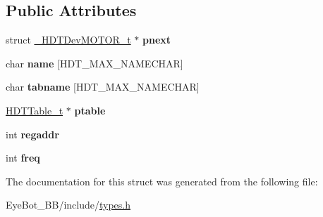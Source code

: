 \subsection*{\-Public \-Attributes}
\begin{DoxyCompactItemize}
\item 
\hypertarget{struct___h_d_t_dev_m_o_t_o_r__t_a4096c0be5a121828b733b51f7176ec40}{struct \hyperlink{struct___h_d_t_dev_m_o_t_o_r__t}{\-\_\-\-H\-D\-T\-Dev\-M\-O\-T\-O\-R\-\_\-t} $\ast$ {\bfseries pnext}}\label{struct___h_d_t_dev_m_o_t_o_r__t_a4096c0be5a121828b733b51f7176ec40}

\item 
\hypertarget{struct___h_d_t_dev_m_o_t_o_r__t_ae97f08ff32dbd4bc530df470c6694d95}{char {\bfseries name} \mbox{[}\-H\-D\-T\-\_\-\-M\-A\-X\-\_\-\-N\-A\-M\-E\-C\-H\-A\-R\mbox{]}}\label{struct___h_d_t_dev_m_o_t_o_r__t_ae97f08ff32dbd4bc530df470c6694d95}

\item 
\hypertarget{struct___h_d_t_dev_m_o_t_o_r__t_acd0c9f9b3ca7d7108f69f8fdfe361ae6}{char {\bfseries tabname} \mbox{[}\-H\-D\-T\-\_\-\-M\-A\-X\-\_\-\-N\-A\-M\-E\-C\-H\-A\-R\mbox{]}}\label{struct___h_d_t_dev_m_o_t_o_r__t_acd0c9f9b3ca7d7108f69f8fdfe361ae6}

\item 
\hypertarget{struct___h_d_t_dev_m_o_t_o_r__t_ab1919a277845955475ddc8a93ad8c2dc}{\hyperlink{struct___h_d_t_table__t}{\-H\-D\-T\-Table\-\_\-t} $\ast$ {\bfseries ptable}}\label{struct___h_d_t_dev_m_o_t_o_r__t_ab1919a277845955475ddc8a93ad8c2dc}

\item 
\hypertarget{struct___h_d_t_dev_m_o_t_o_r__t_a7a9e151bbf6d1278f351e14665858e67}{int {\bfseries regaddr}}\label{struct___h_d_t_dev_m_o_t_o_r__t_a7a9e151bbf6d1278f351e14665858e67}

\item 
\hypertarget{struct___h_d_t_dev_m_o_t_o_r__t_ad0e8c5f3beb25a8b3862275da6cafeaf}{int {\bfseries freq}}\label{struct___h_d_t_dev_m_o_t_o_r__t_ad0e8c5f3beb25a8b3862275da6cafeaf}

\end{DoxyCompactItemize}


\-The documentation for this struct was generated from the following file\-:\begin{DoxyCompactItemize}
\item 
\-Eye\-Bot\-\_\-\-B\-B/include/\hyperlink{types_8h}{types.\-h}\end{DoxyCompactItemize}
